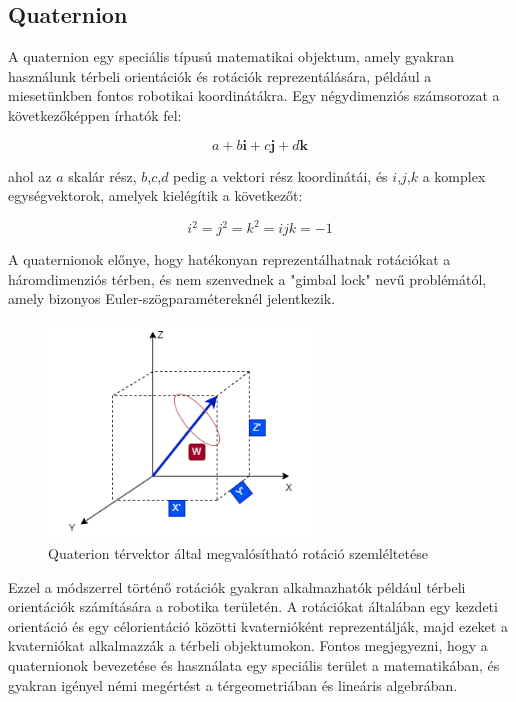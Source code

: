 \subsection{Quaternion}
A quaternion egy speciális típusú matematikai objektum, amely gyakran használunk térbeli orientációk és rotációk reprezentálására, például a miesetünkben fontos robotikai koordinátákra. Egy négydimenziós számsorozat a következőképpen írhatók fel:

\begin{equation}
a + b \textbf{i} + c \textbf{j} + d \textbf{k} 
\end{equation}

ahol az $a$ skalár rész, $b$,$c$,$d$ pedig a vektori rész koordinátái, és $i$,$j$,$k$ a komplex egységvektorok, amelyek kielégítik a következőt: 

\begin{equation}
i^2=j^2=k^2=ijk=-1
\end{equation}

A quaternionok előnye, hogy hatékonyan reprezentálhatnak rotációkat a háromdimenziós térben, és nem szenvednek a "gimbal lock" nevű problémától, amely bizonyos Euler-szögparamétereknél jelentkezik.

\begin{figure}[!ht]
\centering
\includegraphics[width=70mm, keepaspectratio]{figures/Diagrammok/Quaterion}
\caption{Quaterion térvektor által megvalósítható rotáció szemléltetése}
\label{fig:Quaterion}
\end{figure}

Ezzel a módszerrel történő rotációk gyakran alkalmazhatók például térbeli orientációk számítására a robotika területén. A rotációkat általában egy kezdeti orientáció és egy célorientáció közötti kvaternióként reprezentálják, majd ezeket a kvaterniókat alkalmazzák a térbeli objektumokon. Fontos megjegyezni, hogy a quaternionok bevezetése és használata egy speciális terület a matematikában, és gyakran igényel némi megértést a térgeometriában és lineáris algebrában.



